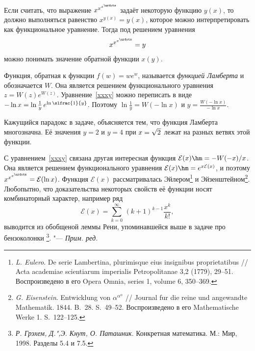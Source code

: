 \documentclass[twoside]{book}
\newenvironment{addedbytheeditors}{\par\medskip\small
}{\par\addvspace{\medskipamount}} %
\begin{document}
\begin{addedbytheeditors}
Если считать, что выражение $x^{x^{ x^{\urdots}}}
$ задаёт некоторую функцию $y(x)$, то должно выполняться равенство $x^{y(x)}=y(x)$, которое можно интерпретировать как функциональное уравнение.
Тогда под решением уравнения 
\begin{equation}
\label{xxxy}
x^{x^{ x^{\urdots}}} %
=y
\end{equation}
можно понимать значение обратной функции $x(y)$.

Функция,  обратная к функции $f(w)=we^w$, называется \emph{функцией Ламберта} и обозначается $W$.
Она является решением функционального уравнения $z=W(z)e^{W(z)}$.
Уравнение~\eqref{xxxy} можно переписать в виде $-\ln x=\ln\frac{1}{y}\,e^{\ln\slfrac{1}{y }}$.
Поэтому $\ln\frac{1}{y }=W(-\ln x)$
и
$y=\frac{W(-\ln x)}{ -\ln x}$.

Кажущийся парадокс в задаче, объясняется тем, что  функция Ламберта многозначна.
Её значения $y=2$ и $y=4$ при $x=\sqrt{2\mkern1mu}$ лежат на разных ветвях этой функции.

С уравнением~\eqref{xxxy} связана другая интересная функция
$\mathcal{E}(x)\hm=-W(-x)/x$.
Она является решением функционального уравнения
$\mathcal{E}(x)\hm=e^{x\mathcal{E}(x)}$, и поэтому $x^{x^{ x^{\urdots}}}
=\mathcal{E}(\ln x)$.
Функция $\mathcal{E}(x)$ рассматривалась Эйлером\footnote{%
\emph{L. Eulero}. De serie Lambertina, plurimisque eius 
insignibus proprietatibus /\!/ Acta academiae scientiarum imperialis 
Petropolitanae 3,2 (1779), 29--51. Воспроизведено в его Opera 
Omnia, series 1, volume 6, 350--369.}
и Эйзенштейном\footnote{%
\emph{G. Eisenstein}. Entwicklung von $\alpha^{\alpha^{\alpha}}$ /\!/ Journal 
fur die reine und angewandte Mathe\-matik. 1844. B.~28. S.~49--52. 
Воспроизведено в его Mathematische Werke 1. S.~122--125.}. 
Любопытно, что доказательства некоторых свойств её функции носят комбинаторный характер, например  ряд
$$\mathcal{E}(x)=\sum_{k=0}^{\infty}\,(k+1)^{k-1}\frac{x^k}{ k!},$$
выводится из обобщеной леммы Рени, упоминавшейся выше в задаче про бензоколонки%
\footnote{\emph{Р. Грэхем, Д.",Э. Кнут, О. Паташник}. Конкретная математика. М.: Мир, 1998. Разделы 5.4 и 7.5.}.
"--- \emph{Прим. ред.}
\end{addedbytheeditors}
\end{document}
